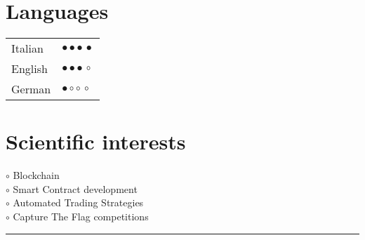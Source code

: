 \documentclass[a4paper,10pt]{article}
\newcommand{\MyVerticalRule}{%
	\textcolor{ColorOne}{\rule{1pt}{\textheight}}
}
\newcommand{\SkillBull}[1]{%
\textcolor{ColorTwo}{#1}
}
\begin{document}
\begin{adjustbox}{valign=t}
\begin{minipage}{0.3\textwidth} %

\section*{Languages}
\begin{tabular}{ll}
    Italian	    & \SkillBull{$\bullet \bullet \bullet \, \bullet$}\\
	English		& \SkillBull{$\bullet \bullet \bullet \, \circ$}\\
	German		& \SkillBull{$\bullet \circ \circ \, \circ$}\\
\end{tabular}

\vfill

\section*{Scientific interests}
\raggedright
\textcolor{ColorOne}{$\circ$} Blockchain\\
\textcolor{ColorOne}{$\circ$} Smart Contract development\\
\textcolor{ColorOne}{$\circ$} Automated Trading Strategies\\
\textcolor{ColorOne}{$\circ$} Capture The Flag competitions

\vfill


\end{minipage}
\end{adjustbox}
%
%
%
\hfill
\begin{adjustbox}{valign=t}
\begin{minipage}{0.05\textwidth} %
\MyVerticalRule  %
\end{minipage}
\end{adjustbox}
\hfill
%
\end{document}
